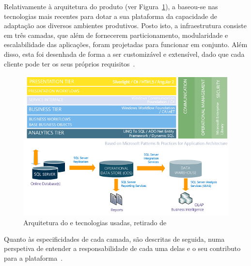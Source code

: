 Relativamente à arquitetura do produto (ver Figura~\ref{fig:mes_framework}), a {\companyname} baseou-se nas tecnologias mais
recentes para dotar a sua plataforma da capacidade de adaptação aos diversos ambientes produtivos. Posto isto, a infraestrutura consiste em três camadas, que além de fornecerem particionamento, modularidade e escalabilidade das aplicações, foram projetadas para funcionar em conjunto. Além disso, esta foi desenhada de forma a ser customizável e extensível, dado que cada cliente pode ter os seus próprios requisitos~\parencite{cmf_mes_framework}.
%
\begin{figure}
    \centering
    \includegraphics[width=\textwidth]{ch02/assets/mes_framework.png}
    \caption{Arquitetura do {\productname} e tecnologias usadas, retirado de~\textcite{cmf_mes_framework}}
    \label{fig:mes_framework}
\end{figure}
%
Quanto às especificidades de cada camada, são descritas de seguida, numa perspetiva de entender a responsabilidade de cada uma delas e o seu contributo para a plataforma~\parencite{cmf_mes_framework}.


